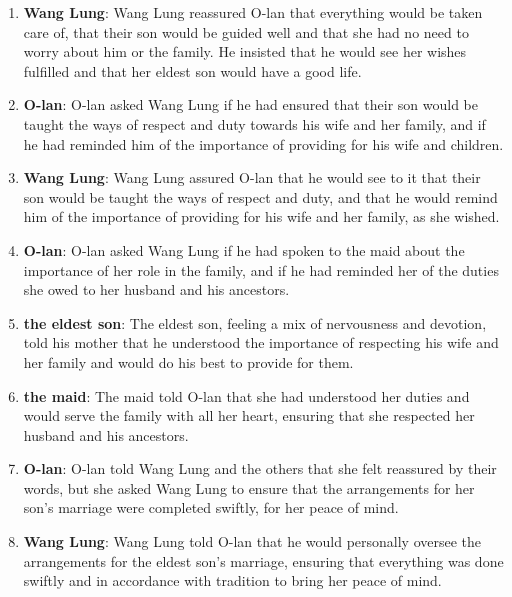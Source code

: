 \documentclass[10pt]{article}
\begin{document}
\begin{enumerate}\setlength{\itemsep}{1pt}\small

\item \textbf{Wang Lung}: Wang Lung reassured O-lan that everything would be taken care of, that their son would be guided well and that she had no need to worry about him or the family. He insisted that he would see her wishes fulfilled and that her eldest son would have a good life.

\item \textbf{O-lan}: O-lan asked Wang Lung if he had ensured that their son would be taught the ways of respect and duty towards his wife and her family, and if he had reminded him of the importance of providing for his wife and children.

\item \textbf{Wang Lung}: Wang Lung assured O-lan that he would see to it that their son would be taught the ways of respect and duty, and that he would remind him of the importance of providing for his wife and her family, as she wished.

\item \textbf{O-lan}: O-lan asked Wang Lung if he had spoken to the maid about the importance of her role in the family, and if he had reminded her of the duties she owed to her husband and his ancestors.

\item \textbf{the eldest son}: The eldest son, feeling a mix of nervousness and devotion, told his mother that he understood the importance of respecting his wife and her family and would do his best to provide for them.

\item \textbf{the maid}: The maid told O-lan that she had understood her duties and would serve the family with all her heart, ensuring that she respected her husband and his ancestors.

\item \textbf{O-lan}: O-lan told Wang Lung and the others that she felt reassured by their words, but she asked Wang Lung to ensure that the arrangements for her son's marriage were completed swiftly, for her peace of mind.

\item \textbf{Wang Lung}: Wang Lung told O-lan that he would personally oversee the arrangements for the eldest son's marriage, ensuring that everything was done swiftly and in accordance with tradition to bring her peace of mind.


\end{enumerate}
\end{document}
